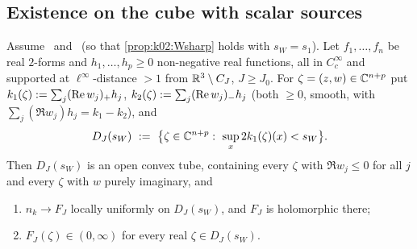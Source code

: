 \subsection{Existence on the cube with scalar sources}\label{ssec:k02:W1}

\begin{theorem}\label{thm:k02:W1}
Assume \Itwo\ and \Ithree\ (so that \cref{prop:k02:Wsharp} holds with $s_W=s_1$). Let $f_1,\dots,f_n$ be real $2$-forms and $h_1,\dots,h_p\ge0$ non-negative real functions, all in $C^\infty_c$ and supported at $\ell^\infty$-distance $>1$ from $\mathbb R^3\setminus C_J$, $J\ge J_0$. For $\zeta=(z,w)\in\mathbb C^{n+p}$ put $k_1(\zeta):=\sum_j(\operatorname{Re} w_j)_+h_j$, $k_2(\zeta):=\sum_j(\operatorname{Re} w_j)_-h_j$ (both $\ge0$, smooth, with $\sum_j(\Re w_j)h_j=k_1-k_2$), and
\[
D_J(s_W)\ \defeq\ \big\{\zeta\in\C^{n+p}:\ \sup_x2k_1(\zeta)(x)<s_W\big\}.
\]
Then $D_J(s_W)$ is an open convex tube, containing every $\zeta$ with $\Re w_j\le0$ for all $j$ and every $\zeta$ with $w$ purely imaginary, and
\begin{enumerate}[label=\textup{(\roman*)},leftmargin=*]
\item $n_k\to F_J$ locally uniformly on $D_J(s_W)$, and $F_J$ is holomorphic there;
\item $F_J(\zeta)\in(0,\infty)$ for every real $\zeta\in D_J(s_W)$.
\end{enumerate}
\end{theorem}

